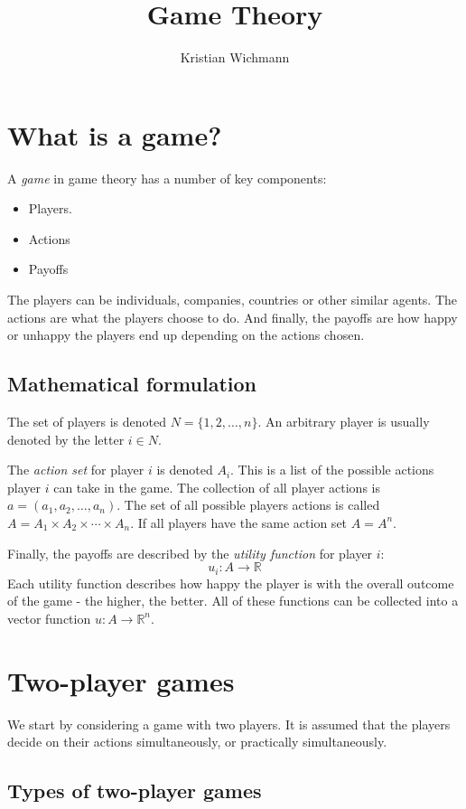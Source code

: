 \documentclass[12pt, a4paper]{article}
\title{Game Theory}
\author{Kristian Wichmann}
\begin{document}
\maketitle

\section{What is a game?}
A \textit{game} in game theory has a number of key components:
\begin{itemize}
\item Players.
\item Actions
\item Payoffs
\end{itemize}
The players can be individuals, companies, countries or other similar agents. The actions are what the players choose to do. And finally, the payoffs are how happy or unhappy the players end up depending on the actions chosen.

\subsection{Mathematical formulation}
The set of players is denoted $N=\{1, 2,\ldots,n\}$. An arbitrary player is usually denoted by the letter $i\in N$.

The \textit{action set} for player $i$ is denoted $A_i$. This is a list of the possible actions player $i$ can take in the game. The collection of all player actions is $a=(a_1,a_2,\ldots,a_n)$. The set of all possible players actions is called $A=A_1\times A_2\times\cdots\times A_n$. If all players have the same action set $A=A^n$.

Finally, the payoffs are described by the \textit{utility function} for player $i$:
\begin{equation}
u_i: A\rightarrow\mathbb{R}
\end{equation}
Each utility function describes how happy the player is with the overall outcome of the game - the higher, the better. All of these functions can be collected into a vector function $u: A\rightarrow\mathbb{R}^n$.

\section{Two-player games}
We start by considering a game with two players. It is assumed that the players decide on their actions simultaneously, or practically simultaneously.

\subsection{Types of two-player games}
\end{document}
